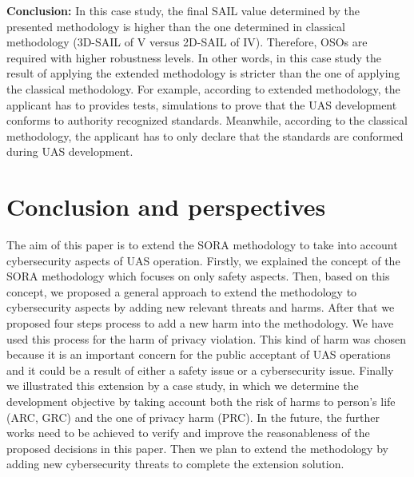 \documentclass[a4paper, 10, conference]{ieeeconf}  %
\begin{document}
\textbf{Conclusion:} In this case study, the final SAIL value determined by the presented methodology is higher than the one determined in classical methodology (3D-SAIL of V versus 2D-SAIL of IV). Therefore, OSOs are required with higher robustness levels. In other words, in this case study the result of applying the extended methodology is stricter than the one of applying the classical methodology. For example, according to extended methodology, the applicant has to provides tests, simulations to prove that the UAS development conforms to authority recognized standards. Meanwhile, according to the classical methodology, the applicant has to only declare that the standards are conformed during UAS development.
 
\section{Conclusion and perspectives} \label{sec:con}
The aim of this paper is to extend the SORA methodology to take into account cybersecurity aspects of UAS operation.
Firstly, we explained the concept of the SORA methodology which focuses on only safety aspects.
Then, based on this concept, we proposed a general approach to extend the methodology to cybersecurity aspects by adding new relevant threats and harms. After that we proposed four steps process to add a new harm into the methodology. We have used this process for the harm of privacy violation. This kind of harm was chosen because it is an important concern for the public acceptant of UAS operations and it could be a result of either a safety issue or a cybersecurity issue. Finally we illustrated this extension by a case study, in which we determine the development objective by taking account both the risk of harms to person's life (ARC, GRC) and the one of privacy harm (PRC). In the future, the further works need to be achieved to verify and improve the reasonableness of the proposed decisions in this paper. Then we plan to extend the methodology by adding new cybersecurity threats to complete the extension solution.





\end{document}
